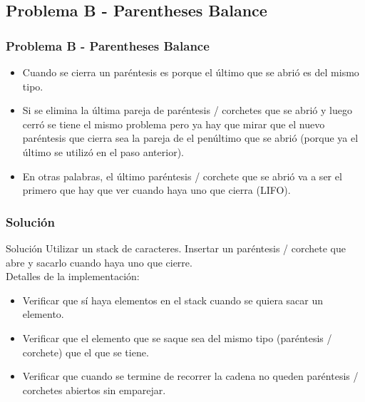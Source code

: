 \documentclass{beamer}
\begin{document}
	\subsection{Problema B - Parentheses Balance}
	\begin{frame}
		\frametitle{Problema B - Parentheses Balance}
		\begin{itemize}
			\item Cuando se cierra un paréntesis es porque el último que se abrió es del mismo tipo.
			\item Si se elimina la última pareja de paréntesis / corchetes que se abrió y luego cerró se tiene el mismo problema pero ya hay que mirar que el nuevo paréntesis que cierra sea la pareja de el penúltimo que se abrió (porque ya el último se utilizó en el paso anterior).
			\item En otras palabras, el último paréntesis / corchete que se abrió va a ser el primero que hay que ver cuando haya uno que cierra (LIFO).
		\end{itemize}
	\end{frame}
	
	\begin{frame}
		\frametitle{Solución}
		\begin{exampleblock}{Solución}
			Utilizar un stack de caracteres. Insertar un paréntesis / corchete que abre y sacarlo cuando haya uno que cierre.\\
			Detalles de la implementación:
			\begin{itemize}
				\item Verificar que sí haya elementos en el stack cuando se quiera sacar un elemento.
				\item Verificar que el elemento que se saque sea del mismo tipo (paréntesis / corchete) que el que se tiene.
				\item Verificar que cuando se termine de recorrer la cadena no queden paréntesis / corchetes abiertos sin emparejar.
			\end{itemize}
		\end{exampleblock}
	\end{frame}
	
\end{document}
